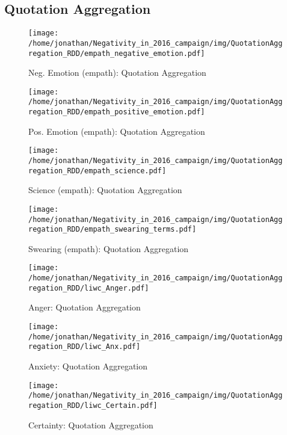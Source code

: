 \subsection{Quotation Aggregation}

\begin{figure}[h]\centering
	\texttt{[image: /home/jonathan/Negativity\_in\_2016\_campaign/img/QuotationAggregation\_RDD/empath\_negative\_emotion.pdf]}
	\caption{Neg. Emotion (empath): Quotation Aggregation}
	\label{fig: qa_Neg. Emotion (empath)}
\end{figure}

\begin{figure}[h]\centering
	\texttt{[image: /home/jonathan/Negativity\_in\_2016\_campaign/img/QuotationAggregation\_RDD/empath\_positive\_emotion.pdf]}
	\caption{Pos. Emotion (empath): Quotation Aggregation}
	\label{fig: qa_Pos. Emotion (empath)}
\end{figure}

\begin{figure}[h]\centering
	\texttt{[image: /home/jonathan/Negativity\_in\_2016\_campaign/img/QuotationAggregation\_RDD/empath\_science.pdf]}
	\caption{Science (empath): Quotation Aggregation}
	\label{fig: qa_Science (empath)}
\end{figure}

\begin{figure}[h]\centering
	\texttt{[image: /home/jonathan/Negativity\_in\_2016\_campaign/img/QuotationAggregation\_RDD/empath\_swearing\_terms.pdf]}
	\caption{Swearing (empath): Quotation Aggregation}
	\label{fig: qa_Swearing (empath)}
\end{figure}

\begin{figure}[h]\centering
	\texttt{[image: /home/jonathan/Negativity\_in\_2016\_campaign/img/QuotationAggregation\_RDD/liwc\_Anger.pdf]}
	\caption{Anger: Quotation Aggregation}
	\label{fig: qa_Anger}
\end{figure}

\begin{figure}[h]\centering
	\texttt{[image: /home/jonathan/Negativity\_in\_2016\_campaign/img/QuotationAggregation\_RDD/liwc\_Anx.pdf]}
	\caption{Anxiety: Quotation Aggregation}
	\label{fig: qa_Anxiety}
\end{figure}

\begin{figure}[h]\centering
	\texttt{[image: /home/jonathan/Negativity\_in\_2016\_campaign/img/QuotationAggregation\_RDD/liwc\_Certain.pdf]}
	\caption{Certainty: Quotation Aggregation}
	\label{fig: qa_Certainty}
\end{figure}

